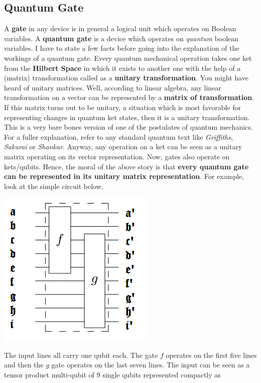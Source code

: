 \documentclass[12pt]{article}
\begin{document}
\subsection{Quantum Gate}
A \textbf{gate} in any device is in general a logical unit which operates on Boolean variables. A \textbf{quantum gate} is a device which operates on \textit{quantum} boolean variables. I have to state a few facts before going into the explanation of the workings of a quantum gate. Every quantum mechanical operation takes one ket from the \textbf{Hilbert Space} in which it exists to another one with the help of a (matrix) transformation called as a \textbf{unitary transformation}. You might have heard of unitary matrices. Well, according to linear algebra, any linear transformation on a vector can be represented by a \textbf{matrix of transformation}. If this matrix turns out to be unitary, a situation which is most favorable for representing changes in quantum ket states, then it is a unitary transformation. This is a very bare bones version of one of the postulates of quantum mechanics. For a fuller explanation, refer to any standard quantum text like \textit{Griffiths}, \textit{Sakurai} or \textit{Shankar}. Anyway, any operation on a ket can be seen as a unitary matrix operating on its vector representation. Now, gates also operate on kets/qubits. Hence, the moral of the above story is that \textbf{every quantum gate can be represented in its unitary matrix representation}. For example, look at the simple circuit below,\\
\begin{center}
\includegraphics[scale=0.8]{qgate1.png}
\end{center}
The input lines all carry one qubit each. The gate $f$ operates on the first five lines and then the $g$ gate operates on the last seven lines. The input can be seen as a tensor product multi-qubit of 9 single qubits represented compactly as
\end{document}
